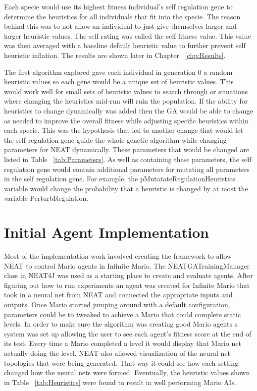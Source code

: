 \documentclass[12pt]{ucthesis} \newif\ifpdf \ifx\pdfoutput\undefined
\begin{document}
Each specie would use its highest fitness individual’s self regulation gene to
determine the heuristics for all individuals that fit into the specie. The
reason behind this was to not allow an individual to just give themselves larger
and larger heuristic values. The self rating was called the self fitness value.
This value was then averaged with a baseline default heuristic value to further
prevent self heuristic inflation. The results are shown later in Chapter
~\ref{chp:Results}.

The first algorithm explored gave each individual in generation 0 a random
heuristic values so each gene would be a unique set of heuristic values. This
would work well for small sets of heuristic values to search through or
situations where changing the heuristics mid-run will ruin the population. If the ability
for heuristics to change dynamically was added then the GA would be able to
change as needed to improve the overall fitness while adjusting specific
heuristics within each specie. This was the hypothesis that led to another
change that would let the self regulation gene guide the whole genetic algorithm
while changing parameters for NEAT dynamically. These parameters that would be
changed are listed in Table ~\ref{tab:Parameters}. As well as containing these
parameters, the self regulation gene would contain additional parameters for
mutating all parameters in the self regulation gene.
For example, the pMutatateRegulationHeuristics variable would change the
probability that a heuristic is changed by at most the variable
PerturbRegulation.


\section{Initial Agent Implementation}

Most of the implementation work involved creating the framework to allow NEAT to
control Mario agents in Infinite Mario. The NEATGATrainingManager class in
NEAT4J was used as a starting place to create and evaluate agents.
After figuring out how to run experiments  an agent was created for
Infinite Mario that took in a neural net from NEAT and connected the appropriate
inputs and outputs. Once Mario started jumping around with a default
configuration, parameters could be to tweaked to achieve a Mario that
could complete static levels.
In order to make sure the algorithm was creating good Mario agents a
system was set up allowing the user to see each agent's fitness score at the
end of its test. Every time a Mario completed a level it would display that
Mario net actually doing the level. NEAT also allowed visualization of the
neural net topologies that were being generated. That way it could see how each
setting changed how the neural nets were formed. Eventually, the heuristic values shown in Table
~\ref{tab:Heuristics} were found to result in well performing Mario AIs.
 
\end{document}
